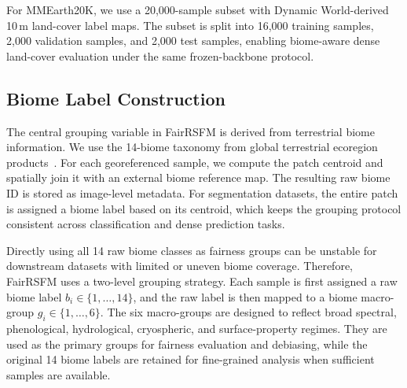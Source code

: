 \documentclass[10pt,twocolumn,letterpaper]{article}
\newcommand{\method}{FairRSFM\xspace}
\begin{document}
\begin{table}[t]
\centering
\caption{\method dataset suite. GEO-Bench datasets are selected for classification and segmentation; the MMEarth20K subset increases dense land-cover segmentation diversity. Sample counts for GEO-Bench tasks follow the modified benchmark setting.}
\label{tab:datasets}
\end{table}

For MMEarth20K, we use a 20,000-sample subset with Dynamic World-derived 10\,m land-cover label maps. The subset is split into 16,000 training samples, 2,000 validation samples, and 2,000 test samples, enabling biome-aware dense land-cover evaluation under the same frozen-backbone protocol.


\subsection{Biome Label Construction}
The central grouping variable in \method is derived from terrestrial biome information. We use the 14-biome taxonomy from global terrestrial ecoregion products~\cite{terrestrialecoregions,ecoregions2017}. For each georeferenced sample, we compute the patch centroid and spatially join it with an external biome reference map. The resulting raw biome ID is stored as image-level metadata. For segmentation datasets, the entire patch is assigned a biome label based on its centroid, which keeps the grouping protocol consistent across classification and dense prediction tasks.

Directly using all 14 raw biome classes as fairness groups can be unstable for downstream datasets with limited or uneven biome coverage. Therefore, \method uses a two-level grouping strategy. Each sample is first assigned a raw biome label \(b_i\in\{1,\ldots,14\}\), and the raw label is then mapped to a biome macro-group \(g_i\in\{1,\ldots,6\}\). The six macro-groups are designed to reflect broad spectral, phenological, hydrological, cryospheric, and surface-property regimes. They are used as the primary groups for fairness evaluation and debiasing, while the original 14 biome labels are retained for fine-grained analysis when sufficient samples are available.
\end{document}
